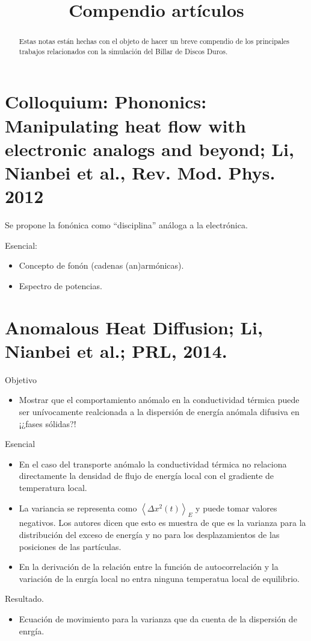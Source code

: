 \documentclass[11pt,letterpaper]{article}
\newcommand{\avg}[1]{\left< #1 \right>} %
\begin{document}
\title{Compendio artículos}
\maketitle

\begin{abstract}
Estas notas están hechas con el objeto de hacer un breve compendio de los principales trabajos relacionados con la simulación del Billar de Discos Duros.
\end{abstract}

\section*{Colloquium: Phononics: Manipulating heat flow with electronic
analogs and beyond; Li, Nianbei et al., Rev. Mod. Phys. 2012}

Se propone la fonónica como ``disciplina'' análoga a la electrónica. 

Esencial:
\begin{itemize}
\item  Concepto de fonón (cadenas (an)armónicas).
\item  Espectro de potencias. 
\end{itemize}

\section*{Anomalous Heat Diffusion; Li, Nianbei et al.; PRL, 2014.}

Objetivo
\begin{itemize}
\item Mostrar que el comportamiento anómalo en la conductividad térmica puede ser unívocamente realcionada a la dispersión de energía anómala difusiva en ¡¿fases sólidas?!
\end{itemize}

Esencial
\begin{itemize}
\item En el caso del transporte anómalo la conductividad térmica no relaciona directamente la densidad de flujo de energía local con el gradiente de temperatura local.
\item La variancia se representa como $\avg{\Delta x^2(t)}_E$ y puede tomar valores negativos. Los autores dicen que esto es muestra de que es la varianza para la distribución del exceso de energía y no para los desplazamientos de las posiciones de las partículas.
\item En la derivación de la relación entre la función de autocorrelación y la variación de la enrgía local no entra ninguna temperatua local de equilibrio.
\end{itemize}

Resultado.
\begin{itemize}
\item Ecuación de movimiento para la varianza que da cuenta de la dispersión de enrgía.
\end{itemize}
\end{document}
